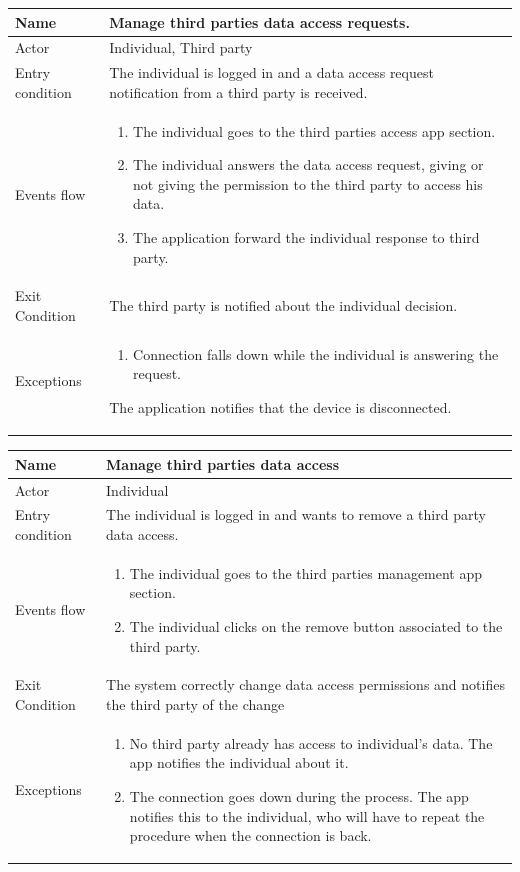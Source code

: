 \begin{tabular}{|l|p{11cm}|}
    \hline
    Name & Manage third parties data access requests.
    \\ \hline
    Actor & Individual, Third party
    \\ \hline 
    Entry condition & The individual is logged in and a data access request notification from a third party is received.
    \\ \hline
    Events flow &
    \begin{enumerate}
	\item The individual goes to the third parties access app section.
    \item The individual answers the data access request, giving or not giving the permission to the third party to access his data.
    \item The application forward the individual response to third party.
    \end{enumerate}
     \\ \hline
     Exit Condition & The third party is notified about the individual decision.
     \\
    \hline
    Exceptions &
        \begin{enumerate}
    \item Connection falls down while the individual is answering the request.
    \end{enumerate}
The application notifies that the device is disconnected.
      \\
    \hline
\end{tabular}

\givespace

\begin{tabular}{|l|p{11cm}|}
    \hline
    Name & Manage third parties data access
    \\ \hline
    Actor & Individual
    \\ \hline 
    Entry condition & The individual is logged in and wants to remove a third party data access.
        \\ \hline
    Events flow &
    \begin{enumerate}
	\item The individual goes to the third parties management app section.
    \item The individual clicks on the remove button associated to the third party.
    \end{enumerate}
     \\ \hline
     Exit Condition & The system correctly change data access permissions and notifies the third party of the change
     \\
    \hline
    Exceptions &
        \begin{enumerate}
    \item No third party already has access to individual's data. The app notifies the individual about it.
    \item The connection goes down during the process. The app notifies this to the individual, who will have to repeat the procedure when the connection is back.
    \end{enumerate}
       \\
    \hline
\end{tabular}

